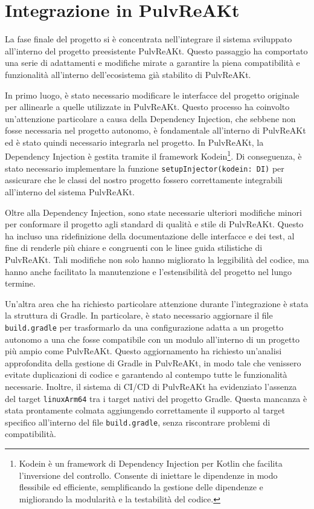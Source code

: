 \documentclass[12pt,a4paper,openright,twoside]{book}
\begin{document}
\section{Integrazione in PulvReAKt}

La fase finale del progetto si è concentrata nell'integrare il sistema sviluppato all'interno del progetto preesistente PulvReAKt. 
Questo passaggio ha comportato una serie di adattamenti e modifiche mirate a garantire la piena compatibilità e funzionalità all'interno dell'ecosistema già stabilito di PulvReAKt.

In primo luogo, è stato necessario modificare le interfacce del progetto originale per allinearle a quelle utilizzate in PulvReAKt. 
Questo processo ha coinvolto un'attenzione particolare a causa della Dependency Injection, che sebbene non fosse necessaria nel progetto autonomo, 
è fondamentale all'interno di PulvReAKt ed è stato quindi necessario integrarla nel progetto. 
In PulvReAKt, la Dependency Injection è gestita tramite il framework Kodein\footnote{
    Kodein è un framework di Dependency Injection per Kotlin che facilita l'inversione del controllo. Consente di iniettare le dipendenze in modo flessibile ed efficiente, 
    semplificando la gestione delle dipendenze e migliorando la modularità e la testabilità del codice.
    }. 
Di conseguenza, è stato necessario implementare la funzione \texttt{setupInjector(kodein: DI)} per assicurare che le classi del nostro progetto fossero correttamente 
integrabili all'interno del sistema PulvReAKt.

Oltre alla Dependency Injection, sono state necessarie ulteriori modifiche minori per conformare il progetto agli standard di qualità e stile di PulvReAKt. 
Questo ha incluso una ridefinizione della documentazione delle interfacce e dei test, al fine di renderle più chiare e congruenti con le linee guida stilistiche di PulvReAKt. 
Tali modifiche non solo hanno migliorato la leggibilità del codice, ma hanno anche facilitato la manutenzione e l'estensibilità del progetto nel lungo termine.

Un'altra area che ha richiesto particolare attenzione durante l'integrazione è stata la struttura di Gradle. 
In particolare, è stato necessario aggiornare il file \texttt{build.gradle} per trasformarlo da una configurazione adatta a un progetto autonomo a una che fosse compatibile 
con un modulo all'interno di un progetto più ampio come PulvReAKt. Questo aggiornamento ha richiesto un'analisi approfondita della gestione di Gradle in PulvReAKt, 
in modo tale che venissero evitate duplicazioni di codice e garantendo al contempo tutte le funzionalità necessarie. 
Inoltre, il sistema di \ac{CI/CD} di PulvReAKt ha evidenziato l'assenza del target \texttt{linuxArm64} tra i target nativi del progetto Gradle. 
Questa mancanza è stata prontamente colmata aggiungendo correttamente il supporto al target specifico all'interno del file \texttt{build.gradle}, 
senza riscontrare problemi di compatibilità.
\end{document}
